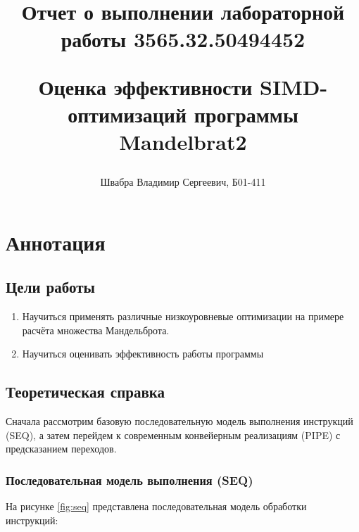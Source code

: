 \documentclass[12pt,a4paper]{article}
\title{
    Отчет о выполнении лабораторной работы 3565.32.50494452
    
    Оценка эффективности SIMD-оптимизаций программы Mandelbrat2
    }
\author{Швабра Владимир Сергеевич, Б01-411}
\begin{document}
\maketitle

\newpage

\section{Аннотация}
\subsection{Цели работы}  
\begin{enumerate}
    \item Научиться применять различные низкоуровневые оптимизации на примере расчёта множества Мандельброта.
    \item Научиться оценивать эффективность работы программы
\end{enumerate}

\subsection{Теоретическая справка}

Сначала рассмотрим базовую последовательную модель выполнения инструкций (SEQ), а затем перейдем к современным конвейерным реализациям (PIPE) с предсказанием переходов.

\subsubsection{Последовательная модель выполнения (SEQ)}
На рисунке \ref{fig:seq} представлена последовательная модель обработки инструкций:
\end{document}
